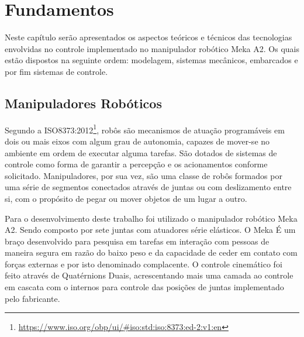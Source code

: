 \chapter{Fundamentos}\label{ch:teory-reference}





\vspace{0.5cm}
Neste capítulo serão apresentados os aspectos teóricos e técnicos das tecnologias envolvidas no controle implementado no manipulador robótico Meka A2. Os quais estão dispostos na seguinte ordem: modelagem, sistemas mecânicos, embarcados e por fim sistemas de controle.

\section{Manipuladores Robóticos}

Segundo a ISO8373:2012\footnote{\url{https://www.iso.org/obp/ui/#iso:std:iso:8373:ed-2:v1:en}}, robôs são mecanismos de atuação programáveis em dois ou mais eixos com algum grau de autonomia, capazes de mover-se no ambiente em ordem de executar alguma tarefas. São dotados de sistemas de controle como forma de garantir a percepção e os acionamentos conforme solicitado. Manipuladores, por sua vez, são uma classe de robôs formados por uma série de segmentos conectados através de juntas ou com deslizamento entre si, com o propósito de pegar ou mover objetos de um lugar a outro.

Para o desenvolvimento deste trabalho foi utilizado o manipulador robótico Meka A2. Sendo composto por sete juntas com atuadores série elásticos. O Meka É um braço desenvolvido para pesquisa em tarefas em interação com pessoas de maneira segura em razão do baixo peso e da capacidade de ceder em contato com forças externas e por isto denominado complacente. O controle cinemático foi feito através de Quatérnions Duais, acrescentando mais uma camada ao controle em cascata com o internos para controle das posições de juntas implementado pelo fabricante.

